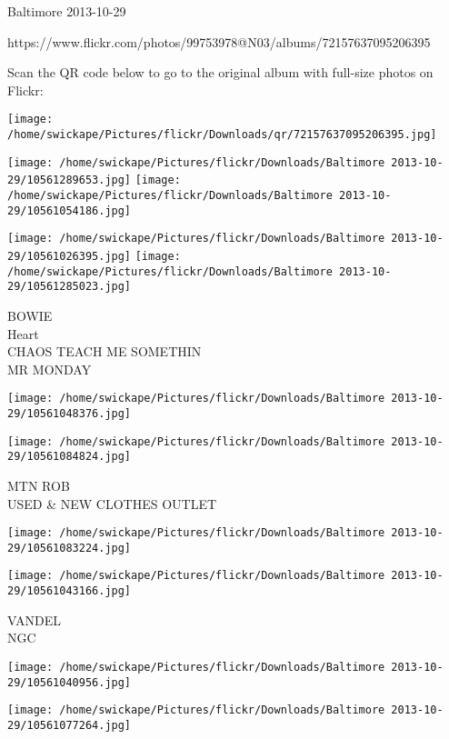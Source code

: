 \documentclass[10pt,letterpaper]{article}
\begin{document}
Baltimore 2013-10-29

https://www.flickr.com/photos/99753978@N03/albums/72157637095206395

Scan the QR code below to go to the original album with full-size photos on Flickr:

\texttt{[image: /home/swickape/Pictures/flickr/Downloads/qr/72157637095206395.jpg]}
\pagebreak

\texttt{[image: /home/swickape/Pictures/flickr/Downloads/Baltimore 2013-10-29/10561289653.jpg]}
\texttt{[image: /home/swickape/Pictures/flickr/Downloads/Baltimore 2013-10-29/10561054186.jpg]}

\texttt{[image: /home/swickape/Pictures/flickr/Downloads/Baltimore 2013-10-29/10561026395.jpg]}
\texttt{[image: /home/swickape/Pictures/flickr/Downloads/Baltimore 2013-10-29/10561285023.jpg]}

BOWIE\\
Heart\\
CHAOS TEACH ME SOMETHIN\\
MR MONDAY\\
\pagebreak

\texttt{[image: /home/swickape/Pictures/flickr/Downloads/Baltimore 2013-10-29/10561048376.jpg]}

\vspace{0.25in}
\texttt{[image: /home/swickape/Pictures/flickr/Downloads/Baltimore 2013-10-29/10561084824.jpg]}

MTN ROB\\
USED \& NEW CLOTHES OUTLET\\
\pagebreak

\texttt{[image: /home/swickape/Pictures/flickr/Downloads/Baltimore 2013-10-29/10561083224.jpg]}

\vspace{0.25in}
\texttt{[image: /home/swickape/Pictures/flickr/Downloads/Baltimore 2013-10-29/10561043166.jpg]}

VANDEL\\
NGC\\
\pagebreak

\texttt{[image: /home/swickape/Pictures/flickr/Downloads/Baltimore 2013-10-29/10561040956.jpg]}

\vspace{0.25in}
\texttt{[image: /home/swickape/Pictures/flickr/Downloads/Baltimore 2013-10-29/10561077264.jpg]}
\end{document}

